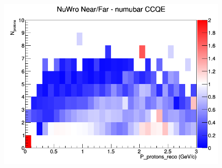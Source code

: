 \begin{figure}[h]
\endminipage
{}
\includegraphics[width=\linewidth]{eff_N_P/FGT/protons/ratios/CCQE_NuWro_numubar_NF_N_P.png}
\endminipage
\newline
\end{figure}
\clearpage
